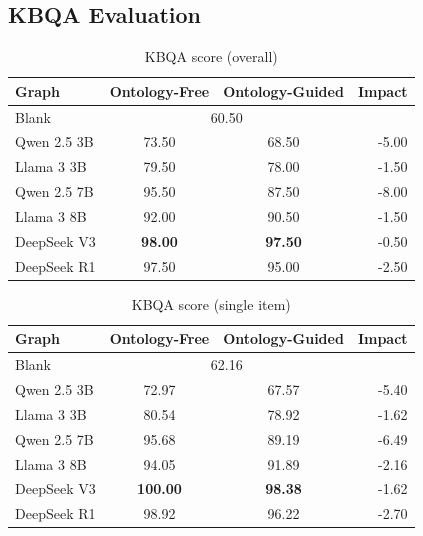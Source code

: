 \documentclass[a4, conference]{IEEEtran}
\begin{document}
\subsection{KBQA Evaluation}

\begin{table}[h]
    \centering
    \caption{KBQA score (overall)}
    \label{tab:qa_percent}
    \begin{tabular}{|l|c|c|r|}
        \hline
        Graph       & Ontology-Free               & Ontology-Guided & Impact \\
        \hline
        Blank       & \multicolumn{2}{|c|}{60.50} &                          \\
        \hline
        Qwen 2.5 3B & 73.50                       & 68.50           & -5.00  \\
        \hline
        Llama 3 3B  & 79.50                       & 78.00           & -1.50  \\
        \hline
        Qwen 2.5 7B & 95.50                       & 87.50           & -8.00  \\
        \hline
        Llama 3 8B  & 92.00                       & 90.50           & -1.50  \\
        \hline
        DeepSeek V3 & \textbf{98.00}              & \textbf{97.50}  & -0.50  \\
        \hline
        DeepSeek R1 & 97.50                       & 95.00           & -2.50  \\
        \hline
    \end{tabular}
\end{table}

\begin{table}[h]
    \centering
    \caption{KBQA score (single item)}
    \label{tab:qa_percent_single}
    \begin{tabular}{|l|c|c|r|}
        \hline
        Graph       & Ontology-Free               & Ontology-Guided & Impact \\
        \hline
        Blank       & \multicolumn{2}{|c|}{62.16} &                          \\
        \hline
        Qwen 2.5 3B & 72.97                       & 67.57           & -5.40  \\
        \hline
        Llama 3 3B  & 80.54                       & 78.92           & -1.62  \\
        \hline
        Qwen 2.5 7B & 95.68                       & 89.19           & -6.49  \\
        \hline
        Llama 3 8B  & 94.05                       & 91.89           & -2.16  \\
        \hline
        DeepSeek V3 & \textbf{100.00}             & \textbf{98.38}  & -1.62  \\
        \hline
        DeepSeek R1 & 98.92                       & 96.22           & -2.70  \\
        \hline
    \end{tabular}
\end{table}
\end{document}
